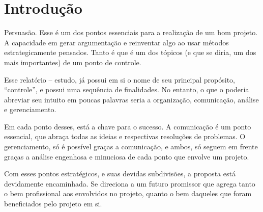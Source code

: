 \chapter*[Introdução]{Introdução}

Persuasão. Esse é um dos pontos essenciais para a realização de um bom projeto. A capacidade em gerar argumentação e reinventar algo ao usar métodos estrategicamente pensados. Tanto é que é um dos tópicos (e que se diria, um dos mais importantes) de um ponto de controle.

Esse relatório – estudo, já possui em si o nome de seu principal propósito, “controle”, e possui uma sequência de finalidades. No entanto, o que o poderia abreviar seu intuito em poucas palavras seria a organização, comunicação, análise e gerenciamento.

Em cada ponto desses, está a chave para o sucesso. A comunicação é um ponto essencial, que abraça todas as ideias e respectivas resoluções de problemas.  O gerenciamento, só é possível graças a comunicação, e ambos, só seguem em frente graças a análise engenhosa e minuciosa de cada ponto que envolve um projeto.  

Com esses pontos estratégicos, e suas devidas subdivisões, a proposta está devidamente encaminhada.  Se direciona a um futuro promissor que agrega tanto o bem profissional aos envolvidos no projeto, quanto o bem daqueles que foram beneficiados pelo projeto em si.